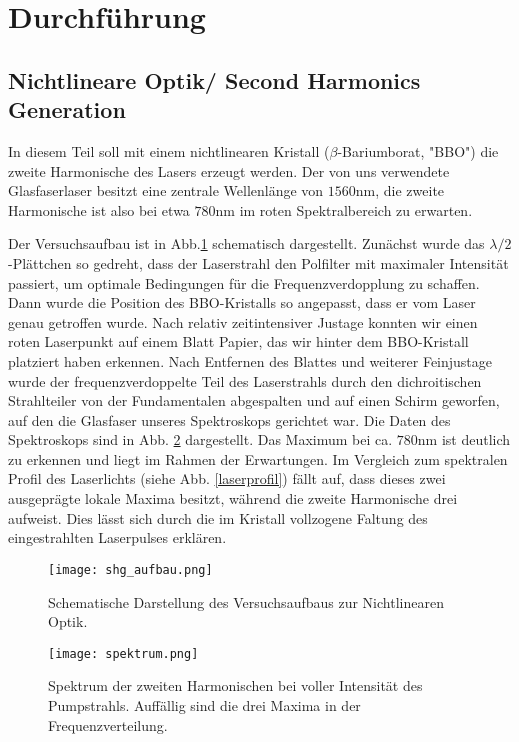 \section{Durchführung}
\subsection{Nichtlineare Optik/ Second Harmonics Generation}
In diesem Teil soll mit einem nichtlinearen Kristall ($\beta$-Bariumborat, "BBO") die zweite Harmonische des Lasers erzeugt werden. Der von uns verwendete Glasfaserlaser besitzt eine zentrale Wellenlänge von $1560\si{\nano\meter}$, die zweite Harmonische ist also bei etwa $780\si{\nano\meter}$ im roten Spektralbereich zu erwarten.
	
Der Versuchsaufbau ist in Abb.\ref{shg_aufbau} schematisch dargestellt.
Zunächst wurde das $\lambda/2$-Plättchen so gedreht, dass der Laserstrahl den Polfilter mit maximaler Intensität passiert, um optimale Bedingungen für die Frequenzverdopplung zu schaffen. Dann wurde die Position des BBO-Kristalls so angepasst, dass er vom Laser genau getroffen wurde. Nach relativ zeitintensiver Justage konnten wir einen roten Laserpunkt auf einem Blatt Papier, das wir hinter dem BBO-Kristall platziert haben erkennen. Nach Entfernen des Blattes und weiterer Feinjustage wurde der frequenzverdoppelte Teil des Laserstrahls durch den dichroitischen Strahlteiler von der Fundamentalen abgespalten und auf einen Schirm geworfen, auf den die Glasfaser unseres Spektroskops gerichtet war. Die Daten des Spektroskops sind in Abb. \ref{shg_spektrum} dargestellt. Das Maximum bei ca. $780\si{\nano\meter}$ ist deutlich zu erkennen und liegt im Rahmen der Erwartungen. Im Vergleich zum spektralen Profil des Laserlichts (siehe Abb. \ref{laserprofil}) fällt auf, dass dieses zwei ausgeprägte lokale Maxima besitzt, während die zweite Harmonische drei aufweist. Dies lässt sich durch die im Kristall vollzogene Faltung des eingestrahlten Laserpulses erklären.
	
\begin{figure}[H]
	\texttt{[image: shg\_aufbau.png]}
	\caption{Schematische Darstellung des Versuchsaufbaus zur Nichtlinearen Optik.}
	\label{shg_aufbau}
\end{figure}
	
\begin{figure}[H]
	\begin{center}
		
	\texttt{[image: spektrum.png]}
	\caption{Spektrum der zweiten Harmonischen bei voller Intensität des Pumpstrahls. Auffällig sind die drei Maxima in der Frequenzverteilung.}
	\label{shg_spektrum}
	\end{center}
\end{figure}


